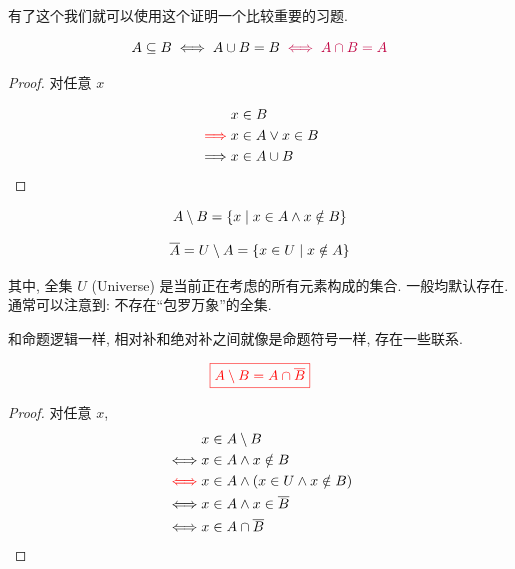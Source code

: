 有了这个我们就可以使用这个证明一个比较重要的习题. 

\begin{theorem}
    \[
      A \subseteq B \iff A \cup B = B \;\textcolor{purple}{\iff A \cap B = A}
    \]
  \end{theorem}
\begin{proof}
    
  对任意 $x$
    
  \setcounter{equation}{0}
  \begin{align*}
    &x \in B \\
    \textcolor{red}{\implies} &x \in A \lor x \in B \\
    \implies &x \in A \cup B
  \end{align*}
\end{proof}

\begin{definition}
  \[
    A \setminus B = \{x \mid x \in A \land x \notin B\}
  \]
\end{definition}

\begin{definition}
  \[
    \overline{A} = U \setminus A = \{x \in U \mid x \notin A\}
  \]

  其中, 全集 $U$ (Universe) 是当前正在考虑的所有元素构成的集合. 一般均默认存在. 通常可以注意到: 不存在``包罗万象''的全集. 
\end{definition}


和命题逻辑一样, 相对补和绝对补之间就像是命题符号一样, 存在一些联系. 

\begin{theorem}
  \[
    \textcolor{red}{\boxed{A \setminus B = A \cap \overline{B}}}
  \]
\end{theorem}

\begin{proof}
  对任意 $x$,
  \setcounter{equation}{0}
  \begin{align*}
    &x \in A \setminus B \\
    \iff & x \in A \land x \notin B \\
    \textcolor{red}{\iff} & x \in A \land (x \in U \land x \notin B) \\
    \iff & x \in A \land x \in \overline{B} \\
    \iff & x \in A \cap \overline{B}
  \end{align*}
\end{proof}

